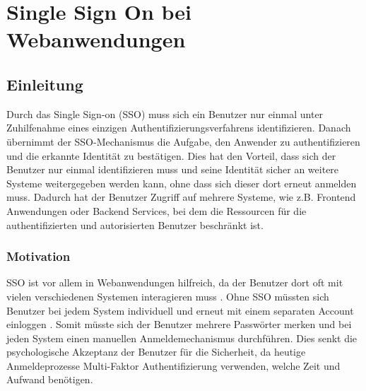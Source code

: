
\chapter{Single Sign On bei Webanwendungen}





\section{Einleitung} \label{EB_Einleitung}

Durch das Single Sign-on (SSO) muss sich ein Benutzer nur einmal unter Zuhilfenahme eines einzigen Authentifizierungsverfahrens identifizieren. Danach übernimmt der SSO-Mechanismus die Aufgabe, den Anwender zu authentifizieren und die erkannte Identität zu bestätigen. Dies hat den Vorteil, dass sich der Benutzer nur einmal identifizieren muss und seine Identität sicher an weitere Systeme weitergegeben werden kann, ohne dass sich dieser dort erneut anmelden muss. Dadurch hat der Benutzer Zugriff auf mehrere Systeme, wie z.B. Frontend Anwendungen oder Backend Services, bei dem die Ressourcen für die authentifizierten und autorisierten Benutzer beschränkt ist.

\subsection{Motivation} %


SSO ist vor allem in Webanwendungen hilfreich, da der Benutzer dort oft mit vielen verschiedenen Systemen interagieren muss \cite{EB34}. Ohne SSO müssten sich Benutzer bei jedem System individuell und erneut mit einem separaten Account einloggen \cite{EB34}. Somit müsste sich der Benutzer mehrere Passwörter merken und bei jeden System einen manuellen Anmeldemechanismus durchführen. Dies senkt die psychologische Akzeptanz der Benutzer für die Sicherheit, da heutige Anmeldeprozesse Multi-Faktor Authentifizierung verwenden, welche Zeit und Aufwand benötigen.

